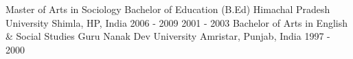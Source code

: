 
\begin{cventries}

  \cventry
    {
    {Master of Arts in Sociology}
    {\newline}
    {Bachelor of Education (B.Ed)}} %
    {Himachal Pradesh University} %
    {Shimla, HP, India} %
    {{2006 - 2009}
    {\newline}
    {2001 - 2003}
    } %
    {}
    \vspace{-.6\baselineskip}
  \cventry
    {Bachelor of Arts in English \& Social Studies} %
    {Guru Nanak Dev University} %
    {Amristar, Punjab, India} %
    {1997 - 2000} %
    {}

\end{cventries}

